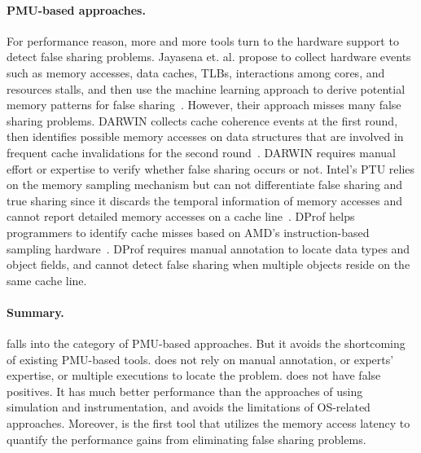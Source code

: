 \paragraph{PMU-based approaches.} For performance reason, more and more tools turn to the hardware support to detect false sharing problems. Jayasena et. al. propose to collect hardware events such as memory accesses, data caches, TLBs, interactions among cores, and resources stalls, and then use the machine learning approach to derive potential memory patterns for false sharing~\cite{mldetect}. However, their approach misses many false sharing problems. DARWIN collects cache coherence events at the first round, then identifies possible memory accesses on data structures that are involved in frequent cache invalidations for the second round~\cite{openmp}. DARWIN requires manual effort or expertise to verify whether false sharing occurs or not. Intel's PTU relies on the memory sampling mechanism but can not differentiate false sharing and true sharing since it discards the temporal information of memory accesses and cannot report detailed memory accesses on a cache line~\cite{detect:ptu}. DProf helps programmers to identify cache misses based on AMD's instruction-based sampling hardware~\cite{DProf}. DProf requires manual annotation to locate data types and object fields, and cannot detect false sharing when multiple objects reside on the same cache line. \\

\paragraph{Summary.} \cheetah{} falls into the category of PMU-based approaches. But it avoids the shortcoming of existing PMU-based tools. \cheetah{} does not rely on manual annotation, or experts' expertise, or multiple executions to locate the problem. \Cheetah{} does not have false positives. It has much better performance than the approaches of using simulation and instrumentation, and avoids the limitations of OS-related approaches. Moreover, \cheetah{} is the first tool that utilizes the memory access latency to quantify the performance gains from eliminating false sharing problems.

